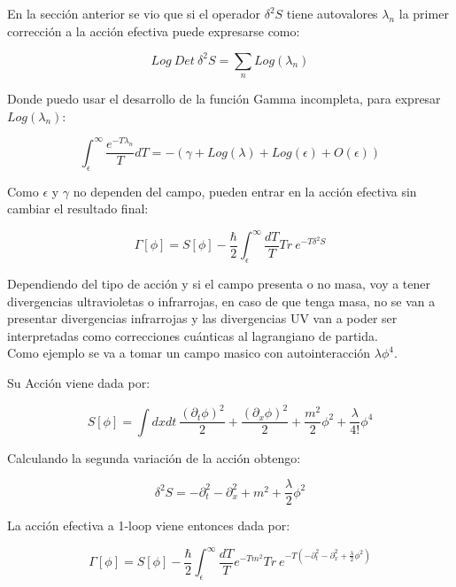 En la sección anterior se vio que si el operador $\delta ^2 S$ tiene autovalores $\lambda _n$ la primer corrección a la acción efectiva puede expresarse como:

\begin{equation}
Log \ Det \ \delta ^2 S = 
\sum _n Log( \lambda _n )
\end{equation}

Donde puedo usar el desarrollo de la función Gamma incompleta, para expresar $Log ( \lambda _n )$:

\begin{equation}
\int _ { \epsilon } ^{\infty} \frac{e ^{- T \lambda _n}}{T} dT =
- \left(
		\gamma + Log ( \lambda ) + Log( \epsilon )  + O ( \epsilon  ) 
		\right)
\end{equation}

Como  $ \epsilon $ y $ \gamma $ no dependen del campo, pueden entrar en la acción efectiva sin cambiar el resultado final:

\begin{equation}
\Gamma [ \phi ] = 
S[ \phi ] - 
\frac{\hbar }{2}
\int _ { \epsilon } ^{\infty} \frac{ dT}{T} Tr \  e ^{- T \delta ^2 S}
\end{equation}

Dependiendo del tipo de acción y si el campo presenta o no masa, voy a tener divergencias ultravioletas o infrarrojas, en caso de que tenga masa, no se van a presentar divergencias infrarrojas y las divergencias UV van a poder ser interpretadas como correcciones cuánticas al lagrangiano de partida. \\


Como ejemplo se va a tomar un campo masico con autointeracción $\lambda \phi ^4 $.

Su Acción viene dada por:

\begin{equation}
S[ \phi ] = \int dx dt \ 
\frac{( \partial _t \phi ) ^2}{2} +  
\frac{( \partial _x \phi ) ^2}{2} +
\frac{m ^2 }{2} \phi ^2 +
\frac{\lambda}{4!} \phi ^4 
\end{equation}

Calculando la segunda variación de la acción obtengo:

\begin{equation}
\delta ^2 S = 
- \partial _t ^2 
- \partial _x ^2 
+ m ^2 
+ \frac{\lambda}{2}\phi ^2 
\end{equation}

La acción efectiva a 1-loop viene entonces dada por:

\begin{equation}
\Gamma [ \phi ] = 
S[ \phi ] - 
\frac{\hbar }{2}
\int _ { \epsilon } ^{\infty} \frac{ dT}{T} 
e ^{- T m ^2 }
Tr \  e ^{- T ( - \partial _t ^2 - \partial _x ^2 + \frac{\lambda}{2} \phi ^2 ) }
\end{equation}

